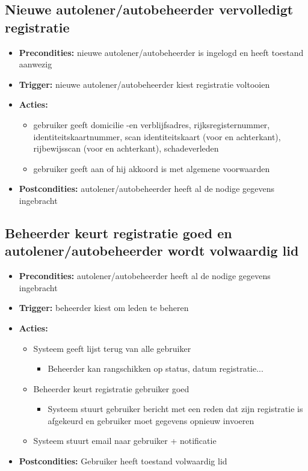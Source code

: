 \documentclass[]{article}
\begin{document}
\subsection{Nieuwe autolener/autobeheerder vervolledigt registratie}
\begin{itemize}
\item \textbf{Precondities:} nieuwe autolener/autobeheerder is ingelogd en heeft toestand aanwezig
\item \textbf{Trigger:} nieuwe autolener/autobeheerder kiest registratie voltooien
\item \textbf{Acties:} \begin{itemize}
\item	gebruiker geeft domicilie -en verblijfsadres, rijksregisternummer, identiteitskaartnummer, scan identiteitskaart (voor en achterkant), rijbewijsscan (voor en achterkant), schadeverleden
\item gebruiker geeft aan of hij akkoord is met algemene voorwaarden
\end{itemize}
\item \textbf{Postcondities:} autolener/autobeheerder heeft al de nodige gegevens ingebracht
\end{itemize}

\subsection{Beheerder keurt registratie goed en autolener/autobeheerder wordt volwaardig lid}
\begin{itemize}
\item \textbf{Precondities:} autolener/autobeheerder heeft al de nodige gegevens ingebracht
\item \textbf{Trigger:} beheerder kiest om leden te beheren
\item \textbf{Acties:} \begin{itemize}
\item Systeem geeft lijst terug van alle gebruiker
\begin{itemize} \item Beheerder kan rangschikken op status, datum registratie...\end{itemize}
\item Beheerder keurt registratie gebruiker goed 
\begin{itemize} \item Systeem stuurt gebruiker bericht met een reden dat zijn registratie is afgekeurd en gebruiker moet gegevens opnieuw invoeren \end{itemize}
\item Systeem stuurt email naar gebruiker + notificatie
\end{itemize}
\item \textbf{Postcondities:} Gebruiker heeft toestand volwaardig lid
\end{itemize}
\end{document}
